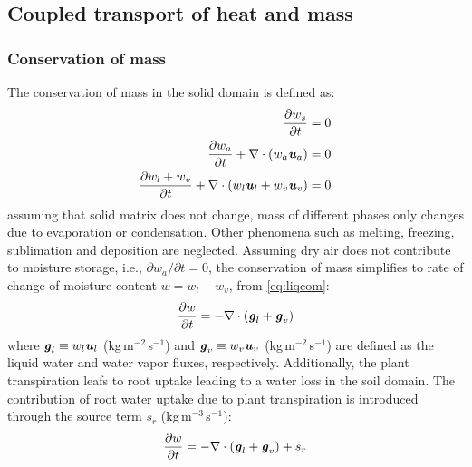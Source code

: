 \subsection{Coupled transport of heat and mass}
\label{subsec:ctoham}
\subsubsection*{Conservation of mass}
The conservation of mass in the solid domain is defined as:
\begin{align}
\frac{\partial w_s}{\partial t} &= 0 \label{eq:solidcom} \\ 
\frac{\partial w_a}{\partial t} + \nabla \cdot \left(w_a\textbf{\textit{u}}_a \right) &= 0 \label{eq:aircom} \\ 
\frac{\partial w_l + w_v}{\partial t} + \nabla \cdot \left(w_l\textbf{\textit{u}}_l + w_v\textbf{\textit{u}}_v \right) &= 0 \label{eq:liqcom}
\end{align}
assuming that solid matrix does not change, mass of different phases only changes due to evaporation or condensation. Other phenomena such as melting, freezing, sublimation and deposition are neglected. Assuming dry air does not contribute to moisture storage, i.e., $\partial w_a / \partial t = 0$, the conservation of mass simplifies to rate of change of moisture content $w = w_l + w_v$, from \cref{eq:liqcom}:
\begin{equation}
 \frac{\partial w}{\partial t} = - \nabla \cdot \left(\textbf{\textit{g}}_l + \textbf{\textit{g}}_v \right)
\end{equation}
where $\textbf{\textit{g}}_l \equiv w_l\textbf{\textit{u}}_l$ (kg\,m$^{-2}$\,s$^{-1}$) and $\textbf{\textit{g}}_v \equiv w_v\textbf{\textit{u}}_v$ (kg\,m$^{-2}$\,s$^{-1}$) are defined as the liquid water and water vapor fluxes, respectively. Additionally, the plant transpiration leafs to root uptake leading to a water loss in the soil domain. The contribution of root water uptake due to plant transpiration is introduced through the source term $s_r$ (kg\,m$^{-3}$\,s$^{-1}$):
\begin{equation}
\frac{\partial w}{\partial t} = - \nabla \cdot \left(\textbf{\textit{g}}_l + \textbf{\textit{g}}_v \right) + s_r
\label{eq:com4}
\end{equation}

